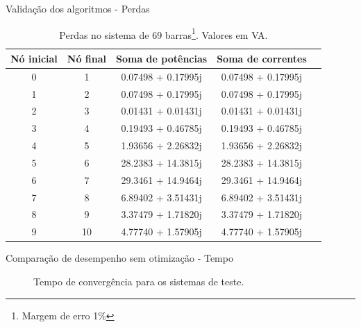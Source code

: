 \documentclass[10pt]{beamer}
\begin{document}
\begin{frame}{Validação dos algoritmos - Perdas}
    \begin{table}
        \caption{Perdas no sistema de 69 barras\footnote{Margem de erro 1\%}. Valores em VA.}
        \begin{tabular}{ccccc}
            \toprule
            Nó inicial & Nó final & Soma de potências & Soma de correntes\\
            \midrule
            0 & 1 & 0.07498 + 0.17995j & 0.07498 + 0.17995j \\
            1 & 2 & 0.07498 + 0.17995j & 0.07498 + 0.17995j \\
            2 & 3 & 0.01431 + 0.01431j & 0.01431 + 0.01431j \\
            3 & 4 & 0.19493 + 0.46785j & 0.19493 + 0.46785j \\
            4 & 5 & 1.93656 + 2.26832j & 1.93656 + 2.26832j \\
            5 & 6 & 28.2383 + 14.3815j & 28.2383 + 14.3815j \\
            6 & 7 & 29.3461 + 14.9464j & 29.3461 + 14.9464j \\
            7 & 8 & 6.89402 + 3.51431j & 6.89402 + 3.51431j \\
            8 & 9 & 3.37479 + 1.71820j & 3.37479 + 1.71820j \\
            9 & 10 & 4.77740 + 1.57905j & 4.77740 + 1.57905j \\
            \bottomrule
        \end{tabular}
    \end{table}
\end{frame}

\begin{frame}{Comparação de desempenho sem otimização - Tempo}
    \begin{figure}
        \centering
        \caption{Tempo de convergência para os sistemas de teste.}
    \end{figure}
\end{frame}
\end{document}
